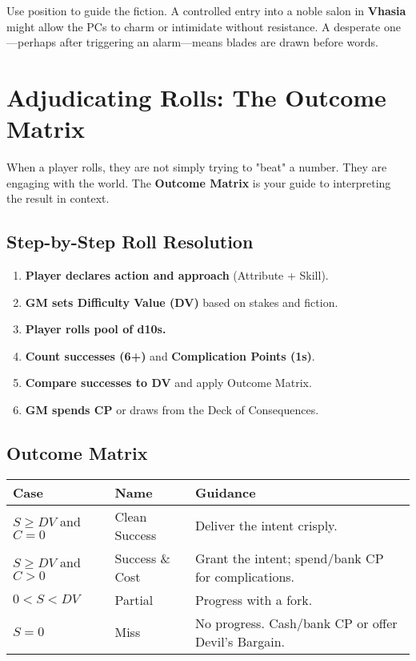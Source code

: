 Use position to guide the fiction. A controlled entry into a noble salon in \textbf{Vhasia} might allow the PCs to charm or intimidate without resistance. A desperate one---perhaps after triggering an alarm---means blades are drawn before words.

\section*{Adjudicating Rolls: The Outcome Matrix}

When a player rolls, they are not simply trying to "beat" a number. They are engaging with the world. The \textbf{Outcome Matrix} is your guide to interpreting the result in context.

\subsection*{Step-by-Step Roll Resolution}

\begin{enumerate}
    \item \textbf{Player declares action and approach} (Attribute + Skill).
    \item \textbf{GM sets Difficulty Value (DV)} based on stakes and fiction.
    \item \textbf{Player rolls pool of d10s.}
    \item \textbf{Count successes (6+)} and \textbf{Complication Points (1s)}.
    \item \textbf{Compare successes to DV} and apply Outcome Matrix.
    \item \textbf{GM spends CP} or draws from the Deck of Consequences.
\end{enumerate}

\subsection*{Outcome Matrix}

\begin{center}
\begin{tabular}{lll}
\toprule
\textbf{Case} & \textbf{Name} & \textbf{Guidance} \\
\midrule
$S \geq DV$ and $C = 0$ & Clean Success\index{Clean Success} & Deliver the intent crisply. \\
$S \geq DV$ and $C > 0$ & Success \& Cost\index{Success \& Cost} & Grant the intent; spend/bank CP for complications. \\
$0 < S < DV$ & Partial\index{Partial} & Progress with a fork. \\
$S = 0$ & Miss\index{Miss} & No progress. Cash/bank CP or offer Devil's Bargain\index{Devil's Bargain}. \\
\bottomrule
\end{tabular}
\end{center}

